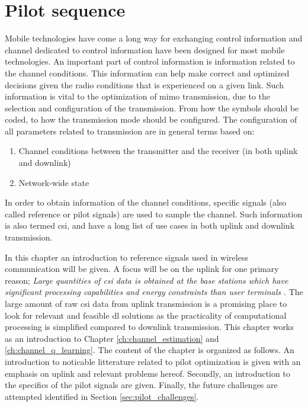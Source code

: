 \chapter{Pilot sequence}\label{ch:pilot_sequence}

Mobile technologies have come a long way for exchanging control information and channel dedicated to control information have been designed for most mobile technologies. An important part of control information is information related to the channel conditions. This information can help make correct and optimized decisions given the radio conditions that is experienced on a given link. Such information is vital to the optimization of \gls{mimo} transmission, due to the selection and configuration of the transmission. From how the symbols should be coded, to how the transmission mode should be configured. The configuration of all parameters related to transmission are in general terms based on:

\begin{enumerate}
    \item Channel conditions between the transmitter and the receiver (in both uplink and downlink)
    \item Network-wide state
\end{enumerate}

In order to obtain information of the channel conditions, specific signals (also called reference or pilot signals) are used to sample the channel. Such information is also termed \gls{csi}, and have a long list of use cases in both uplink and downlink transmission.

In this chapter an introduction to reference signals used in wireless communication will be given. A focus will be on the uplink for one primary reason; \emph{Large quantities of \gls{csi} data is obtained at the base stations which have significant processing capabilities and energy constraints than user terminals \cite{Studer2018}}. The large amount of raw \gls{csi} data from uplink transmission is a promising place to look for relevant and feasible \gls{dl} solutions as the practicality of computational processing is simplified compared to downlink transmission. This chapter works as an introduction to Chapter \ref{ch:channel_estimation} and \ref{ch:channel_q_learning}. The content of the chapter is organized as follows. An introduction to noticable litterature related to pilot optimization is given with an emphasis on uplink and relevant problems hereof. Secondly, an introduction to the specifics of the pilot signals are given. Finally, the future challenges are attempted identified in Section \ref{sec:pilot_challenges}.


